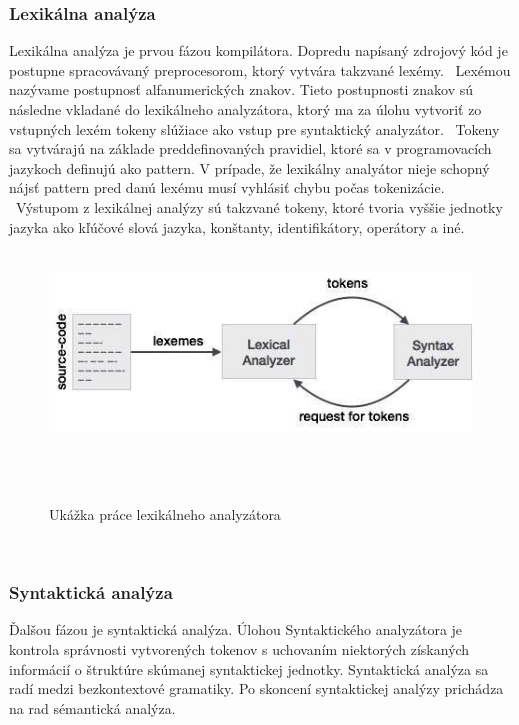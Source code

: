 \subsubsection{Lexikálna analýza}
	\indent Lexikálna analýza je prvou fázou kompilátora. Dopredu napísaný zdrojový kód je postupne spracovávaný preprocesorom, ktorý vytvára takzvané lexémy. 
	 \newline Lexémou nazývame postupnosť alfanumerických znakov. Tieto postupnosti znakov sú následne vkladané do lexikálneho analyzátora, ktorý ma za úlohu vytvoriť zo vstupných lexém tokeny slúžiace ako vstup pre syntaktický analyzátor. 
	 \newline Tokeny sa vytvárajú na základe preddefinovaných pravidiel, ktoré sa v programovacích jazykoch definujú ako pattern. V prípade, že lexikálny analyátor nieje schopný nájsť  pattern pred danú lexému musí vyhlásiť chybu počas tokenizácie.  
	 \newline Výstupom z lexikálnej analýzy sú takzvané tokeny, ktoré tvoria vyššie jednotky jazyka ako kľúčové slová jazyka, konštanty, identifikátory, operátory a iné.\cite{gram}
	 
	 \begin{figure}[!htbp]
	 	\centering
	 	\includegraphics[width=15cm]{img/lexical_analysis.jpg}
	 	\caption{Ukážka práce lexikálneho analyzátora}
	 	\label{fig:test}
	 \end{figure}
 \newline
 
\subsubsection{Syntaktická analýza}
\indent Ďalšou fázou je syntaktická analýza. Úlohou Syntaktického analyzátora je kontrola správnosti vytvorených tokenov s uchovaním niektorých získaných informácií o štruktúre skúmanej syntaktickej jednotky. Syntaktická analýza sa radí medzi bezkontextové gramatiky. Po skoncení syntaktickej analýzy prichádza na rad sémantická analýza.\cite{gram}

